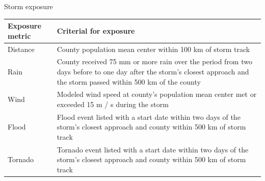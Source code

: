 \documentclass[ignorenonframetext,]{beamer}
\begin{document}
\begin{frame}{Storm exposure}

\footnotesize

\begin{longtable}[]{@{}ll@{}}
\toprule
\begin{minipage}[b]{0.24\columnwidth}\raggedright\strut
Exposure metric\strut
\end{minipage} & \begin{minipage}[b]{0.65\columnwidth}\raggedright\strut
Criterial for exposure\strut
\end{minipage}\tabularnewline
\midrule
\endhead
\begin{minipage}[t]{0.24\columnwidth}\raggedright\strut
Distance\strut
\end{minipage} & \begin{minipage}[t]{0.65\columnwidth}\raggedright\strut
County population mean center within 100 km of storm track\strut
\end{minipage}\tabularnewline
\begin{minipage}[t]{0.24\columnwidth}\raggedright\strut
Rain\strut
\end{minipage} & \begin{minipage}[t]{0.65\columnwidth}\raggedright\strut
County received 75 mm or more rain over the period from two days before
to one day after the storm's closest approach and the storm passed
within 500 km of the county\strut
\end{minipage}\tabularnewline
\begin{minipage}[t]{0.24\columnwidth}\raggedright\strut
Wind\strut
\end{minipage} & \begin{minipage}[t]{0.65\columnwidth}\raggedright\strut
Modeled wind speed at county's population mean center met or exceeded 15
m / s during the storm\strut
\end{minipage}\tabularnewline
\begin{minipage}[t]{0.24\columnwidth}\raggedright\strut
Flood\strut
\end{minipage} & \begin{minipage}[t]{0.65\columnwidth}\raggedright\strut
Flood event listed with a start date within two days of the storm's
closest approach and county within 500 km of storm track\strut
\end{minipage}\tabularnewline
\begin{minipage}[t]{0.24\columnwidth}\raggedright\strut
Tornado\strut
\end{minipage} & \begin{minipage}[t]{0.65\columnwidth}\raggedright\strut
Tornado event listed with a start date within two days of the storm's
closest approach and county within 500 km of storm track\strut
\end{minipage}\tabularnewline
\bottomrule
\end{longtable}

\end{frame}
\end{document}
